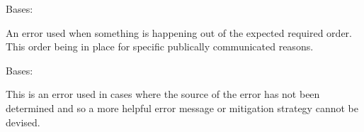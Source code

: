 \documentclass[letterpaper,11pt,english]{sphinxmanual}
\begin{document}

\begin{savenotes}\begin{fulllineitems}
\label{\detokenize{code/opihiexarata.library.error:opihiexarata.library.error.SequentialOrderError}}
\pysigstartsignatures
{}
\pysigstopsignatures
\sphinxAtStartPar
Bases: {\hyperref[\detokenize{code/opihiexarata.library.error:opihiexarata.library.error.ExarataException}]{}}

\sphinxAtStartPar
An error used when something is happening out of the expected required
order. This order being in place for specific publically communicated
reasons.

\end{fulllineitems}\end{savenotes}


\begin{savenotes}\begin{fulllineitems}
\label{\detokenize{code/opihiexarata.library.error:opihiexarata.library.error.UndiscoveredError}}
\pysigstartsignatures
{}
\pysigstopsignatures
\sphinxAtStartPar
Bases: {\hyperref[\detokenize{code/opihiexarata.library.error:opihiexarata.library.error.ExarataBaseException}]{}}

\sphinxAtStartPar
This is an error used in cases where the source of the error has not
been determined and so a more helpful error message or mitigation strategy
cannot be devised.

\end{fulllineitems}\end{savenotes}
\end{document}
